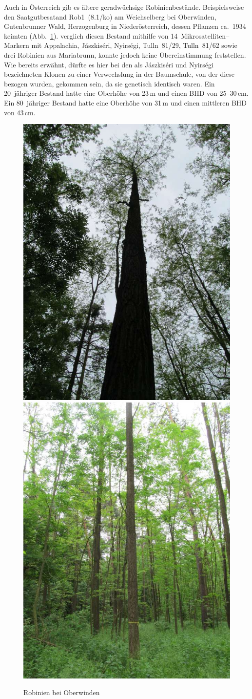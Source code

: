 \documentclass[twocolumn]{scrartcl}
\begin{document}
Auch in Österreich gib es ältere geradwüchsige Robinienbestände.
Beispielsweise den Saatgutbesatand Rob1~(8.1/ko) am Weichselberg bei
Oberwinden, Gutenbrunner Wald, Herzogenburg in Niederösterreich,
dessen Pflanzen ca.\ 1934 keimten (Abb.~\ref{fig:hezogenburg}).
\citet{heinze2014robinie} verglich diesen Bestand mithilfe von 14~Mikrosatelliten--Markern mit Appalachia, Jászkiséri, Nyirségi, Tulln~81/29, Tulln~81/62 sowie drei Robinien aus Mariabrunn, konnte jedoch keine Übereinstimmung feststellen.
Wie bereits erwähnt, dürfte es hier bei den als Jászkiséri und Nyirségi bezeichneten Klonen zu einer Verwechslung in der Baumschule, von der diese bezogen wurden, gekommen sein, da sie genetisch identisch waren.
Ein 20~jähriger Bestand hatte eine Oberhöhe von
23\,m und einen BHD von 25--30\,cm. Ein 80~jähriger Bestand hatte eine
Oberhöhe von 31\,m und einen mittleren BHD von 43\,cm.

\begin{figure}[htbp]
  \centering
  \includegraphics[width=.45\linewidth]{./bild/HerzogenburgRobinie2023a}
  \includegraphics[width=.45\linewidth]{./bild/HerzogenburgRobinie2023b}
  \caption{Robinien bei Oberwinden}
  \label{fig:hezogenburg}
\end{figure}
\end{document}
